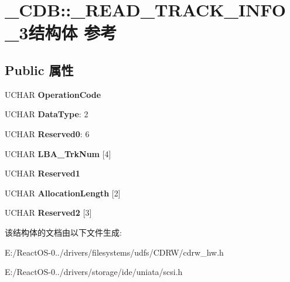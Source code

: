 \hypertarget{struct___c_d_b_1_1___r_e_a_d___t_r_a_c_k___i_n_f_o__3}{}\section{\+\_\+\+C\+DB\+:\+:\+\_\+\+R\+E\+A\+D\+\_\+\+T\+R\+A\+C\+K\+\_\+\+I\+N\+F\+O\+\_\+3结构体 参考}
\label{struct___c_d_b_1_1___r_e_a_d___t_r_a_c_k___i_n_f_o__3}
\subsection*{Public 属性}
\begin{DoxyCompactItemize}
\item 
\mbox{\label{struct___c_d_b_1_1___r_e_a_d___t_r_a_c_k___i_n_f_o__3_a36136002d29cf3da5905a3b91efeac0d}} 
U\+C\+H\+AR {\bfseries Operation\+Code}
\item 
\mbox{\label{struct___c_d_b_1_1___r_e_a_d___t_r_a_c_k___i_n_f_o__3_a277efc48b5bcfc7b8751eee852f6322e}} 
U\+C\+H\+AR {\bfseries Data\+Type}\+: 2
\item 
\mbox{\label{struct___c_d_b_1_1___r_e_a_d___t_r_a_c_k___i_n_f_o__3_a17081067e2bd32cf61e8d12189a14249}} 
U\+C\+H\+AR {\bfseries Reserved0}\+: 6
\item 
\mbox{\label{struct___c_d_b_1_1___r_e_a_d___t_r_a_c_k___i_n_f_o__3_a3223019f8a459ea509734aaf035aea41}} 
U\+C\+H\+AR {\bfseries L\+B\+A\+\_\+\+Trk\+Num} \mbox{[}4\mbox{]}
\item 
\mbox{\label{struct___c_d_b_1_1___r_e_a_d___t_r_a_c_k___i_n_f_o__3_a125c8dab1d23fa33a2e77e42cc6b1398}} 
U\+C\+H\+AR {\bfseries Reserved1}
\item 
\mbox{\label{struct___c_d_b_1_1___r_e_a_d___t_r_a_c_k___i_n_f_o__3_a332efc984737c21dc9dd7f8a40325535}} 
U\+C\+H\+AR {\bfseries Allocation\+Length} \mbox{[}2\mbox{]}
\item 
\mbox{\label{struct___c_d_b_1_1___r_e_a_d___t_r_a_c_k___i_n_f_o__3_a4b13be12f2a0685659bb03810ba9592e}} 
U\+C\+H\+AR {\bfseries Reserved2} \mbox{[}3\mbox{]}
\end{DoxyCompactItemize}


该结构体的文档由以下文件生成\+:\begin{DoxyCompactItemize}
\item 
E\+:/\+React\+O\+S-\/0../drivers/filesystems/udfs/\+C\+D\+R\+W/cdrw\+\_\+hw.\+h\item 
E\+:/\+React\+O\+S-\/0../drivers/storage/ide/uniata/scsi.\+h\end{DoxyCompactItemize}
